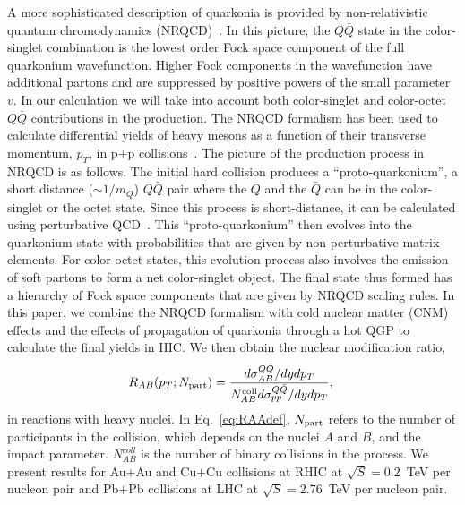 \documentclass[article,showpacs,preprintnumbers,amsmath,amssymb]{revtex4}
\newcommand{\barQ}{{\bar{Q}}}
\begin{document}
A more sophisticated description of quarkonia is provided by non-relativistic
quantum chromodynamics (NRQCD)~\cite{Bodwin:1994jh}. In this picture, the
$Q\barQ$ state in the color-singlet combination is the lowest order Fock space
component of the full quarkonium wavefunction. Higher Fock components in the
wavefunction have additional partons and are suppressed by positive powers of
the small parameter $v$. In our calculation we will take into account both
color-singlet and color-octet $Q\barQ$ contributions in the production. The
NRQCD formalism has been used to calculate differential yields of heavy mesons
as a function of their transverse momentum, $p_T$, in p$+$p
collisions~\cite{Bodwin:1994jh,Cho:1995ce,Cho:1995vh,Braaten:2000cm,Cooper:LongAndShort}.
The picture of the production process in NRQCD is as follows. The initial hard
collision produces a ``proto-quarkonium'', a short distance ($\sim1/m_Q$)
$Q\barQ$ pair  where the $Q$ and the $\barQ$ can be in the color-singlet or the
octet state. Since this process is short-distance, it can be calculated using
perturbative QCD~\cite{Kang:2011mg}. This ``proto-quarkonium'' then evolves
into the quarkonium state with probabilities that are given by non-perturbative
matrix elements.  For color-octet states, this evolution process also involves
the emission of soft partons to form a net color-singlet object. The final
state thus formed has a hierarchy of Fock space components that are given by
NRQCD scaling rules. In this paper, we combine the NRQCD formalism with  cold
nuclear matter (CNM) effects and the effects of propagation of quarkonia
through a hot QGP to calculate the final yields in HIC. We then obtain the
nuclear modification ratio, 
\begin{equation}
R_{AB} (p_T; N_{\rm{part}}) = \frac{ d\sigma^{ Q \bar{Q}}_{AB}/dydp_T  } {  N^{\rm
coll}_{AB}  d\sigma^{ Q \bar{Q}}_{pp}/dydp_T  },\;\label{eq:RAAdef}
\end{equation}
in reactions with heavy nuclei. In Eq.~\ref{eq:RAAdef}, $N_{\rm{part}}$ refers
to the number of participants in the collision, which depends on the nuclei $A$
and $B$, and the impact parameter. $N^{coll}_{AB}$ is the number of binary
collisions in the process. We present results for Au$+$Au and Cu$+$Cu
collisions at RHIC at $\sqrt{S}=0.2$~TeV per nucleon pair and Pb$+$Pb
collisions at LHC at $\sqrt{S}=2.76$~TeV per nucleon pair.
\end{document}
